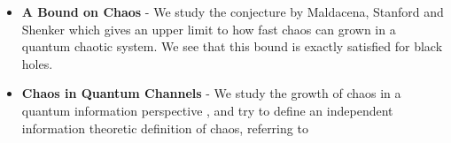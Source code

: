 \begin{itemize}
	\item \textbf{A Bound on Chaos} - We study the conjecture by Maldacena, Stanford and Shenker \cite{Maldacena:2015waa} which gives an upper limit to how fast chaos can grown in a quantum chaotic system. We see that this bound is exactly satisfied for black holes.
	
	\item \textbf{Chaos in Quantum Channels} - We study the growth of chaos in a quantum information perspective \cite{Hosur:2015ylk}, and try to define an independent information theoretic definition of chaos, referring to 
	
\end{itemize}


